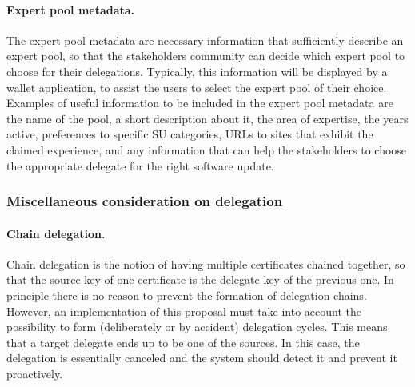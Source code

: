 \documentclass[11pt,a4paper]{article}
\begin{document}
\paragraph{Expert pool metadata.}
The expert pool metadata are necessary information that sufficiently describe an
expert pool, so that the stakeholders community can decide which expert pool to
choose for their delegations.
%
Typically, this information will be displayed by a wallet application, to assist
the users to select the expert pool of their choice. Examples of useful
information to be included in the expert pool metadata are the name of the pool,
a short description about it, the area of expertise, the years active,
preferences to specific SU categories, URLs to sites that exhibit the claimed
experience, and any information that can help the stakeholders to choose the
appropriate delegate for the right software update.

\subsubsection{Miscellaneous consideration on delegation}
\label{sec:misc-cons-deleg}

\paragraph{Chain delegation.}
Chain delegation is the notion of having multiple certificates chained together,
so that the source key of one certificate is the delegate key of the previous
one. In principle there is no reason to prevent the formation of delegation
chains. However, an implementation of this proposal must take into account the
possibility to form (deliberately or by accident) delegation cycles. This means
that a target delegate ends up to be one of the sources. In this case, the
delegation is essentially canceled and the system should detect it and prevent
it proactively.
\end{document}
